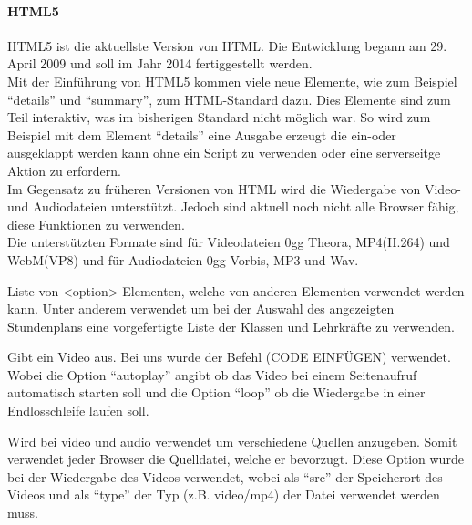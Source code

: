 \paragraph{HTML5}
HTML5 ist die aktuellste Version von HTML. Die Entwicklung begann am 29. April 2009 und soll im Jahr 2014 fertiggestellt werden.\\
Mit der Einführung von HTML5 kommen viele neue Elemente, wie zum Beispiel \enquote{details} und \enquote{summary}, zum HTML-Standard dazu. Dies Elemente sind zum Teil interaktiv, was im bisherigen Standard nicht möglich war. So wird zum Beispiel mit dem Element \enquote{details} eine Ausgabe erzeugt die ein-oder ausgeklappt werden kann ohne ein Script zu verwenden oder eine serverseitge Aktion zu erfordern.\\
Im Gegensatz zu früheren Versionen von HTML wird die Wiedergabe von Video- und Audiodateien unterstützt. Jedoch sind aktuell noch nicht alle Browser fähig, diese Funktionen zu verwenden.\\
Die unterstützten Formate sind für Videodateien 0gg Theora, MP4(H.264) und WebM(VP8) und für Audiodateien 0gg Vorbis, MP3 und Wav. \\
\begin{description}[style=nextline]
\item[in SIS verwendete Funktionen:]
\item[datalist] Liste von <option> Elementen, welche von anderen Elementen verwendet werden kann. Unter anderem verwendet um bei der Auswahl des angezeigten Stundenplans eine vorgefertigte Liste der Klassen und Lehrkräfte zu verwenden.
\item[video] Gibt ein Video aus. Bei uns wurde der Befehl (CODE EINFÜGEN) verwendet. Wobei die Option \enquote{autoplay} angibt ob das Video bei einem Seitenaufruf automatisch starten soll und die Option \enquote{loop} ob die Wiedergabe in einer Endlosschleife laufen  soll.
\item[source] Wird bei video und audio verwendet um verschiedene Quellen anzugeben. Somit verwendet jeder Browser die Quelldatei, welche er bevorzugt. Diese Option wurde bei der Wiedergabe des Videos verwendet, wobei als \enquote{src} der Speicherort des Videos und als \enquote{type} der Typ (z.B. video/mp4) der Datei verwendet werden muss. 
\end{description}